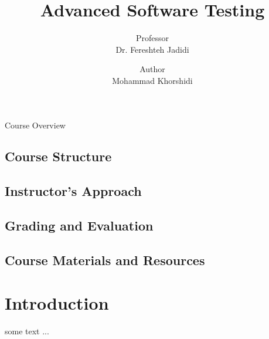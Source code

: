\documentclass[a4paper, 10pt]{book}
\title{\huge {\bold Advanced Software Testing}}
\author{Professor\\{\bold Dr. Fereshteh Jadidi}}
\date{Author\\{\bold Mohammad Khorshidi}}
\begin{document}
    \maketitle
    \newpage

    \begin{center}
        \Large {\bold Course Overview}
    \end{center}

    \section{Course Structure}

    \section{Instructor's Approach}

    \section{Grading and Evaluation}

    \section{Course Materials and Resources}

    \tableofcontents
    
    \chapter{{\bold Introduction}}


        some text ...
\end{document}
